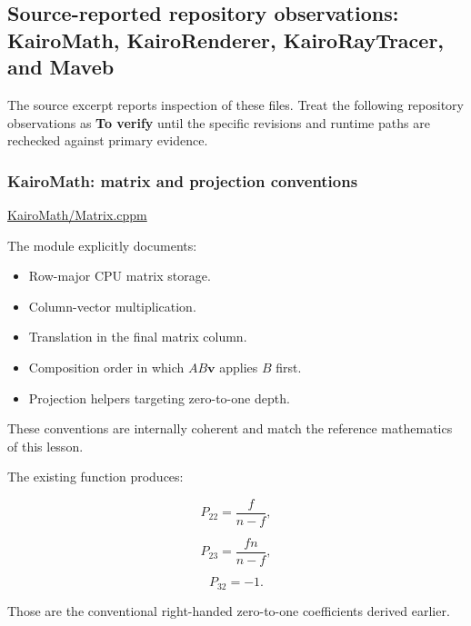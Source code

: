 \subsection{Source-reported repository observations: KairoMath, KairoRenderer, KairoRayTracer, and Maveb}\label{02-foundations-ii-ch037-source-reported-repository-observations-kairomath-kairorenderer-kairoraytracer-and-maveb}

\hypertarget{02-foundations-ii-ch037-source-reported-repository-observations-kairomath-kairorenderer-kairoraytracer-and-maveb}{}

The source excerpt reports inspection of these files. Treat the following repository observations as \textbf{To verify} until the specific revisions and runtime paths are rechecked against primary evidence.

\subsubsection{KairoMath: matrix and projection conventions}\label{02-foundations-ii-ch037-kairomath-matrix-and-projection-conventions}

\hypertarget{02-foundations-ii-ch037-kairomath-matrix-and-projection-conventions}{}

\href{https://github.com/swayam8624/KairoMath/blob/master/Matrix.cppm?utm_source=chatgpt.com}{KairoMath/Matrix.cppm}

The module explicitly documents:

\begin{itemize}
\tightlist
\item
  Row-major CPU matrix storage.
\item
  Column-vector multiplication.
\item
  Translation in the final matrix column.
\item
  Composition order in which \(AB\mathbf v\) applies \(B\) first.
\item
  Projection helpers targeting zero-to-one depth.
\end{itemize}

These conventions are internally coherent and match the reference mathematics of this lesson.

The existing  function produces:

\[
 P_{22}=\frac f{n-f},
\]

\[
 P_{23}=\frac{fn}{n-f},
\]

\[
 P_{32}=-1.
\]

Those are the conventional right-handed zero-to-one coefficients derived earlier.

